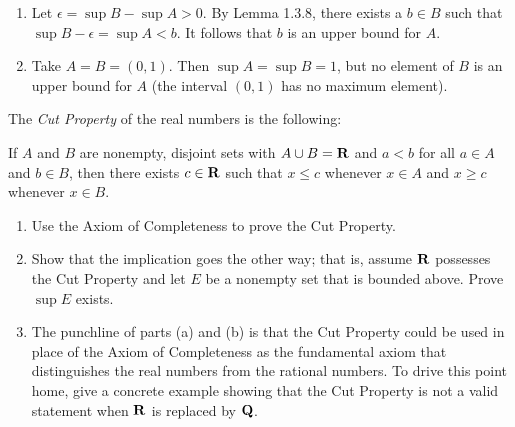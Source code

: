 \documentclass{lew98_solutions}
\begin{document}
\begin{solution}
    \begin{enumerate}
        \item Let \( \epsilon = \sup B - \sup A > 0 \). By Lemma 1.3.8, there exists a \( b \in B \) such that \( \sup B - \epsilon = \sup A < b \). It follows that \( b \) is an upper bound for \( A \).

        \item Take \( A = B = (0, 1) \). Then \( \sup A = \sup B = 1 \), but no element of \( B \) is an upper bound for \( A \) (the interval \( (0, 1) \) has no maximum element).
    \end{enumerate}
\end{solution}

\begin{exercise}
\label{ex:1.3.10}
    The \textit{Cut Property} of the real numbers is the following:

    If \( A \) and \( B \) are nonempty, disjoint sets with \( A \cup B = \mathbf{R} \) and \( a < b \) for all \( a \in A \) and \( b \in B \), then there exists \( c \in \mathbf{R} \) such that \( x \leq c \) whenever \( x \in A \) and \( x \geq c \) whenever \( x \in B \).
    \begin{enumerate}
        \item Use the Axiom of Completeness to prove the Cut Property.

        \item Show that the implication goes the other way; that is, assume \( \mathbf{R} \) possesses the Cut Property and let \( E \) be a nonempty set that is bounded above. Prove \( \sup E \) exists.

        \item The punchline of parts (a) and (b) is that the Cut Property could be used in place of the Axiom of Completeness as the fundamental axiom that distinguishes the real numbers from the rational numbers. To drive this point home, give a concrete example showing that the Cut Property is not a valid statement when \( \mathbf{R} \) is replaced by \( \mathbf{Q} \).
    \end{enumerate}
\end{exercise}
\end{document}
